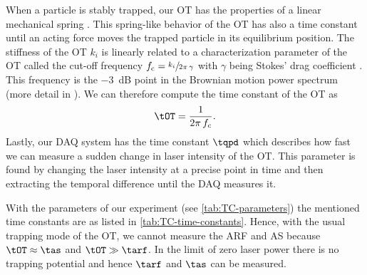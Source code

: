 When a particle is stably trapped, our OT has the properties of a linear 
mechanical spring \cite{Lamprecht2016}. This spring-like behavior of the OT has 
also a time constant until an acting force moves the trapped particle in its 
equilibrium position. The stiffness of the OT $k_{i}$ is linearly related to a 
characterization parameter of the OT called the cut-off frequency $f_{\text{c}} 
= \sfrac{k_{i}}{2\pi\,\gamma}$ with $\gamma$ being Stokes' drag coefficient 
\cite{Lamprecht2016,Lamprecht2017}. This frequency is the \SI{-3}{\dB} point 
in the Brownian motion power spectrum (more detail in 
\cite{Lakaemper2015,Lamprecht2016}). We can therefore compute the time 
constant of the OT as
\begin{equation}
  \tOT = \frac{1}{2\pi\,f_{c}}.
  \label{eq:TC-tau-OT}
\end{equation}
Lastly, our DAQ system has the time constant $\tqpd$ which describes how fast we 
can measure a sudden change in laser intensity of the OT. This parameter is 
found by changing the laser intensity at a precise point in time and then 
extracting the temporal difference until the DAQ measures it. 

With the parameters of our experiment (see \cref{tab:TC-parameters}) the mentioned 
time constants are as listed in \cref{tab:TC-time-constants}. Hence, with the 
usual trapping mode of the OT, we cannot measure the ARF and AS because $\tOT 
\approx \tas$ and $\tOT\gg\tarf$. In the limit of zero laser power there is no 
trapping potential and hence $\tarf$ and $\tas$ can be measured.

